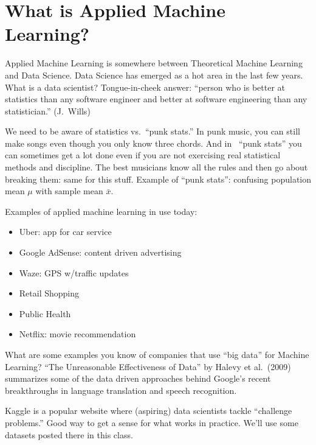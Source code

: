\documentclass[a4paper]{article}
\begin{document}
\section{What is Applied Machine Learning?}
Applied Machine Learning is somewhere between Theoretical Machine Learning and Data Science.
Data Science has emerged as a hot area in the last few years.  What is a data scientist?  Tongue-in-cheek answer: ``person who is better at statistics than any software engineer and better at software engineering than any statistician.'' (J.\ Wills)

We need to be aware of statistics vs.\ ``punk stats.''  In punk music, you can still make songs even though you only know three chords. And in \ ``punk stats'' you can sometimes get a lot done even if you are not exercising real statistical methods and discipline. The best musicians know all the rules and then go about breaking them: same for this stuff.  Example of ``punk stats'': confusing population mean $\mu$ with sample mean $\bar x$.

Examples of applied machine learning in use today:
\begin{itemize}
\item Uber: app for car service
\item Google AdSense: content driven advertising
\item Waze: GPS w/traffic updates
\item Retail Shopping
\item Public Health
\item Netflix: movie recommendation
\end{itemize}
What are some examples you know of companies that use ``big data'' for Machine Learning?  ``The Unreasonable Effectiveness of Data'' by Halevy et al.\ (2009) summarizes some of the data driven approaches behind Google's recent breakthroughs in language translation and speech recognition.

Kaggle is a popular website where (aspiring) data scientists tackle ``challenge problems.''  Good way to get a sense for what works in practice.  We'll use some datasets posted there in this class.
\end{document}
